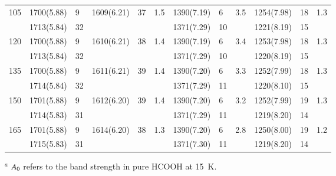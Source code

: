 \documentclass{aa}
\begin{document}
\begin{appendix}
\begin{table*}
\begin{center}
\begin{tabular}{l|lllll|lll|lll}
105          & 1700(5.88) & 9 & 1609(6.21) & 37 & 1.5 & 1390(7.19) & 6 & 3.5 &1254(7.98) & 18 & 1.3\\
             & 1713(5.84) &32 &            &    &     & 1371(7.29) &10 &     &1221(8.19) & 15 &    \\
120          & 1700(5.88) & 9 & 1610(6.21) & 38 & 1.4 & 1390(7.19) & 6 & 3.4 &1253(7.98) & 18 & 1.3\\
             & 1713(5.84) &32 &            &    &     & 1371(7.29) &10 &     &1220(8.19) & 15 &    \\
135          & 1700(5.88) & 9 & 1611(6.21) & 39 & 1.4 & 1390(7.20) & 6 & 3.3 &1252(7.99) & 18 & 1.3\\
             & 1714(5.84) &32 &            &    &     & 1371(7.29) &11 &     &1220(8.10) & 15 &    \\
150          & 1701(5.88) & 9 & 1612(6.20) & 39 & 1.4 & 1390(7.20) & 6 & 3.2 &1252(7.99) & 19 & 1.3\\
             & 1714(5.83) &31 &            &    &     & 1371(7.29) &11 &     &1219(8.20) & 14 &    \\
165          & 1701(5.88) & 9 & 1614(6.20) & 38 & 1.3 & 1390(7.20) & 6 & 2.8 &1250(8.00) & 19 & 1.2\\
             & 1715(5.83) &31 &            &    &     & 1371(7.30) &11 &     &1219(8.20) & 14 &    \\
\hline
\end{tabular}
\end{center}

$^a$ $A_{\rm0}$ refers to the band strength in pure HCOOH at 15~K.

\end{table*}


\end{appendix}
\end{document}

